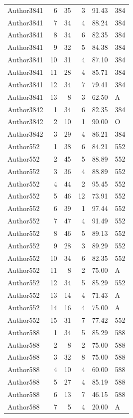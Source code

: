 \begin{longtable}{lrrrrl}
Author3841 & 6 & 35 & 3 & 91.43 & 384\\
Author3841 & 7 & 34 & 4 & 88.24 & 384\\
Author3841 & 8 & 34 & 6 & 82.35 & 384\\
Author3841 & 9 & 32 & 5 & 84.38 & 384\\
Author3841 & 10 & 31 & 4 & 87.10 & 384\\
Author3841 & 11 & 28 & 4 & 85.71 & 384\\
Author3841 & 12 & 34 & 7 & 79.41 & 384\\
Author3841 & 13 & 8 & 3 & 62.50 & A\\
Author3842 & 1 & 34 & 6 & 82.35 & 384\\
Author3842 & 2 & 10 & 1 & 90.00 & O\\
Author3842 & 3 & 29 & 4 & 86.21 & 384\\
Author552 & 1 & 38 & 6 & 84.21 & 552\\
Author552 & 2 & 45 & 5 & 88.89 & 552\\
Author552 & 3 & 36 & 4 & 88.89 & 552\\
Author552 & 4 & 44 & 2 & 95.45 & 552\\
Author552 & 5 & 46 & 12 & 73.91 & 552\\
Author552 & 6 & 39 & 1 & 97.44 & 552\\
Author552 & 7 & 47 & 4 & 91.49 & 552\\
Author552 & 8 & 46 & 5 & 89.13 & 552\\
Author552 & 9 & 28 & 3 & 89.29 & 552\\
Author552 & 10 & 34 & 6 & 82.35 & 552\\
Author552 & 11 & 8 & 2 & 75.00 & A\\
Author552 & 12 & 34 & 5 & 85.29 & 552\\
Author552 & 13 & 14 & 4 & 71.43 & A\\
Author552 & 14 & 16 & 4 & 75.00 & A\\
Author552 & 15 & 31 & 7 & 77.42 & 552\\
Author588 & 1 & 34 & 5 & 85.29 & 588\\
Author588 & 2 & 8 & 2 & 75.00 & 588\\
Author588 & 3 & 32 & 8 & 75.00 & 588\\
Author588 & 4 & 10 & 4 & 60.00 & 588\\
Author588 & 5 & 27 & 4 & 85.19 & 588\\
Author588 & 6 & 13 & 7 & 46.15 & 588\\
Author588 & 7 & 5 & 4 & 20.00 & A\\

\end{longtable}
